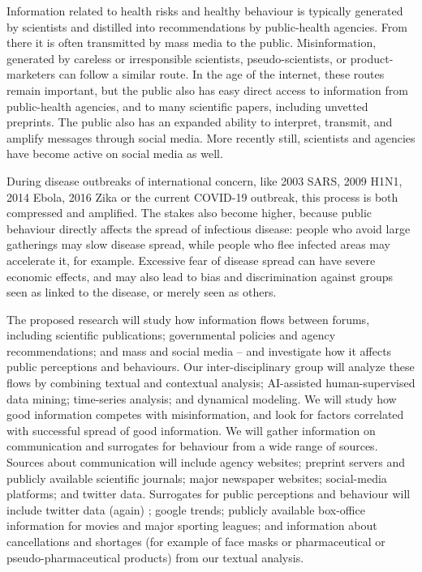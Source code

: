


Information related to health risks and healthy behaviour is typically generated by scientists and distilled into recommendations by public-health agencies. From there it is often transmitted by mass media to the public. Misinformation, generated by careless or irresponsible scientists, pseudo-scientists, or product-marketers can follow a similar route. In the age of the internet, these routes remain important, but the public also has easy direct access to information from public-health agencies, and to many scientific papers, including unvetted preprints. The public also has an expanded ability to interpret, transmit, and amplify messages through social media. More recently still, scientists and agencies have become active on social media as well.

During disease outbreaks of international concern, like 2003 SARS, 2009 H1N1, 2014 Ebola, 2016 Zika   or the current COVID-19 outbreak, this process  is both compressed and amplified. The stakes also become higher, because public behaviour directly affects the spread of infectious disease: people who avoid large gatherings may slow disease spread, while people who flee infected areas may accelerate it, for example. Excessive fear of disease spread can have severe economic effects, and may also lead to bias and discrimination against groups seen as linked to the disease, or merely seen as others. 

The proposed research will study how information flows between forums, including scientific publications; governmental policies and agency recommendations; and mass and social media -- and investigate how it affects public perceptions and behaviours. 
Our inter-disciplinary group will analyze these flows by combining textual and contextual analysis; AI-assisted human-supervised data mining; time-series analysis; and dynamical modeling. We will study how good information competes with misinformation, and look for factors correlated with successful spread of good information. 
We will gather information on communication and surrogates for behaviour from a wide range of sources. 
Sources about communication will include agency websites; preprint servers and publicly available scientific journals; major newspaper websites; social-media platforms; and twitter data. 
Surrogates for public perceptions and behaviour will include twitter data (again) ; google trends; publicly available box-office information for movies and major sporting leagues; and information  about cancellations and shortages (for example of face masks or pharmaceutical or pseudo-pharmaceutical products) from our textual analysis. 

